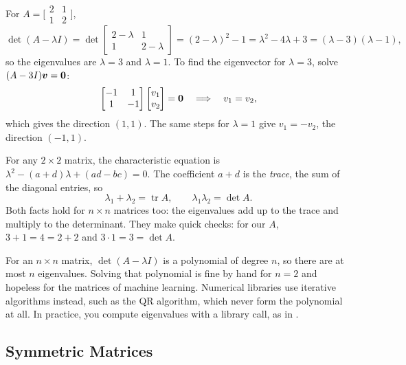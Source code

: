 \begin{example}
  \label{ex:ch04-eigen-2x2}
  For $A = \bigl[\begin{smallmatrix} 2 & 1 \\ 1 & 2 \end{smallmatrix}\bigr]$,
  \[
    \det(A - \lambda I)
    = \det \begin{bmatrix} 2 - \lambda & 1 \\ 1 & 2 - \lambda \end{bmatrix}
    = (2 - \lambda)^2 - 1
    = \lambda^2 - 4\lambda + 3
    = (\lambda - 3)(\lambda - 1),
  \]
  so the eigenvalues are $\lambda = 3$ and $\lambda = 1$. To find the
  eigenvector for $\lambda = 3$, solve $(A - 3I)\bm{v} = \bm{0}$:
  \[
    \begin{bmatrix} -1 & 1 \\ 1 & -1 \end{bmatrix}
    \begin{bmatrix} v_1 \\ v_2 \end{bmatrix} = \bm{0}
    \quad\Longrightarrow\quad v_1 = v_2 ,
  \]
  which gives the direction $(1, 1)$. The same steps for $\lambda = 1$
  give $v_1 = -v_2$, the direction $(-1, 1)$.
\end{example}

For any $2 \times 2$ matrix, the characteristic equation is
$\lambda^2 - (a + d)\lambda + (ad - bc) = 0$. The coefficient $a + d$ is
the \emph{trace}, the sum of the diagonal entries, so
\[
  \lambda_1 + \lambda_2 = \operatorname{tr} A, \qquad
  \lambda_1 \lambda_2 = \det A .
\]
Both facts hold for $n \times n$ matrices too: the eigenvalues add up to
the trace and multiply to the determinant. They make quick checks: for
our $A$, $3 + 1 = 4 = 2 + 2$ and $3 \cdot 1 = 3 = \det A$.

For an $n \times n$ matrix, $\det(A - \lambda I)$ is a polynomial of
degree $n$, so there are at most $n$ eigenvalues. Solving that
polynomial is fine by hand for $n = 2$ and
hopeless for the matrices of machine learning. Numerical libraries use
iterative algorithms instead, such as the QR algorithm, which never form
the polynomial at all. In practice, you compute eigenvalues with a library
call, as in .

\subsection{Symmetric Matrices}
\label{sec:ch04-symmetric}

